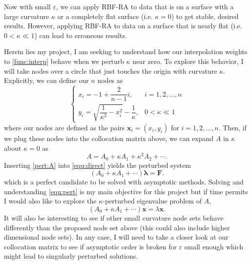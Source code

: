 \documentclass[a4paper,11pt]{article}
\newcommand{\eps}{\varepsilon}
\begin{document}
Now with small $ \eps $, we can apply RBF-RA to data that is on a surface with a large curvature $ \kappa $ or a completely flat surface (i.e. $ \kappa = 0 $) to get stable, desired results. However, applying RBF-RA to data on a surface that is nearly flat (i.e. $ 0 < \kappa \ll 1 $) can lead to erroneous results. 

Herein lies my project, I am seeking to understand how our interpolation weights to \eqref{func:interp} behave when we perturb $ \kappa $ near zero. To explore this behavior, I will take nodes over a circle that just touches the origin with curvature $ \kappa $. Explicitly, we can define our $ n $ nodes as
\[
	\begin{cases}
		x_i = -1 + \dfrac{2}{n - 1} i, & i = 1, 2, \ldots, n \\
		y_i = \sqrt{\dfrac{1}{\kappa^2} - x_i^2} - \dfrac{1}{\kappa}, & 0 < \kappa \ll 1
	\end{cases}
\]
where our nodes are defined as the pairs $ \mathbf{x}_i = (x_i, y_i) $ for $ i = 1, 2, \ldots, n $. Then, if we plug these nodes into the collocation matrix above, we can expand $ A $ in $ \kappa $ about $ \kappa = 0 $ as
\begin{equation}
	A = A_0 + \kappa A_1 + \kappa^2 A_2 + \cdots. \label{pert:A}
\end{equation}
Inserting \eqref{pert:A} into \eqref{equ:direct} yields the perturbed system
\begin{equation}
	(A_0 + \kappa A_1 + \cdots) \pmb{\lambda} = \mathbf{F}.
\end{equation}
which is a perfect candidate to be solved with asymptotic methods. Solving and understanding \eqref{equ:pert} is my main objective for this project but if time permits I would also like to explore the $ \kappa $-perturbed eigenvalue problem of $ A $,
\[
		(A_0 + \kappa A_1 + \cdots) \mathbf{x} = \lambda \mathbf{x}.
\]
 It will also be interesting to see if other small curvature node sets behave differently than the proposed node set above (this could also include higher dimensional node sets). In any case, I will need to take a closer look at our collocation matrix to see if asymptotic order is broken for $ \eps $ small enough which might lead to singularly perturbed solutions.
\end{document}
